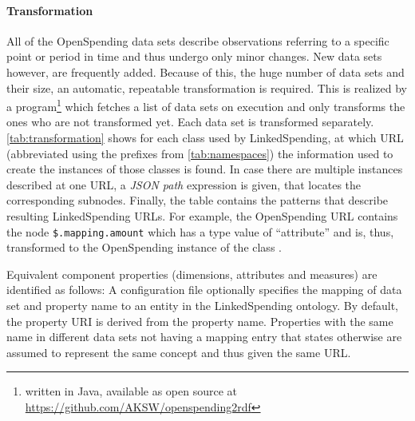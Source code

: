 \documentclass[sw]{iosart2x}
\begin{document}
\paragraph{Transformation}
All of the OpenSpending data sets describe observations referring to a specific point or period in time and thus undergo only minor changes.
New data sets however, are frequently added. Because of this, the huge number of data sets and their size, an automatic, repeatable transformation is required.
This is realized by a program\footnote{written in Java, available as open source at \url{https://github.com/AKSW/openspending2rdf}} which fetches a list of data sets on execution and only transforms the ones who are not transformed yet. Each data set is transformed separately.
\autoref{tab:transformation} shows for each class used by LinkedSpending, at which URL (abbreviated using the prefixes from \cref{tab:namespaces}) the information used to create the instances of those classes is found. %
In case there are multiple instances described at one URL, a \emph{JSON path}\footnotemark{} expression is given, that locates the corresponding subnodes.
Finally, the table contains the patterns that describe resulting LinkedSpending URLs.
For example, the OpenSpending URL  contains the node \texttt{\$.mapping.amount} which has a type value of \enquote{attribute} and is, thus, transformed to the OpenSpending instance  of the class .

Equivalent component properties (dimensions, attributes and measures) are identified as follows:
A configuration file optionally specifies the mapping of data set and property name to an entity in the LinkedSpending ontology.
By default, the property URI is derived from the property name.
Properties with the same name in different data sets not having a mapping entry that states otherwise are assumed to represent the same concept and thus given the same URL.\footnotemark
{}

\end{document}
